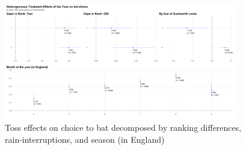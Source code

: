 \documentclass[11pt,  letterpaper]{article}
\begin{document}
\begin{figure}
 \centering
 \includegraphics[width=0.9\textwidth,keepaspectratio]{output/first_stage_by_rank_dl_season.pdf}
 \caption{Toss effects on choice to bat decomposed by ranking differences, rain-interruptions, and season (in England)}
 \label{fig:fs_het_TE3}
\end{figure}
\end{document}
